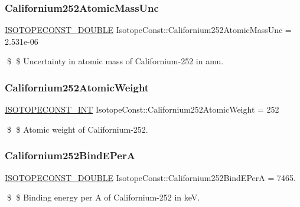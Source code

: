 \subsubsection{\texorpdfstring{Californium252\+Atomic\+Mass\+Unc}{Californium252AtomicMassUnc}}
{\footnotesize\ttfamily \mbox{\hyperlink{group___isotope_const-_macros_ga8f45a7272ce02c0b4c65c44636ed719a}{I\+S\+O\+T\+O\+P\+E\+C\+O\+N\+S\+T\+\_\+\+D\+O\+U\+B\+LE}} Isotope\+Const\+::\+Californium252\+Atomic\+Mass\+Unc = 2.\+531e-\/06}

\$ \$ Uncertainty in atomic mass of Californium-\/252 in amu. \mbox{\label{group___isotope_const-_californium-_cf252_ga51081fcf255fac099ec5047fd42c68a4}} 
\subsubsection{\texorpdfstring{Californium252\+Atomic\+Weight}{Californium252AtomicWeight}}
{\footnotesize\ttfamily \mbox{\hyperlink{group___isotope_const-_macros_ga5f18360b3e99483a35c32d789e62621c}{I\+S\+O\+T\+O\+P\+E\+C\+O\+N\+S\+T\+\_\+\+I\+NT}} Isotope\+Const\+::\+Californium252\+Atomic\+Weight = 252}

\$ \$ Atomic weight of Californium-\/252. \mbox{\label{group___isotope_const-_californium-_cf252_ga22b9f8ddb8edafda23c8887112bb5a52}} 
\subsubsection{\texorpdfstring{Californium252\+Bind\+E\+PerA}{Californium252BindEPerA}}
{\footnotesize\ttfamily \mbox{\hyperlink{group___isotope_const-_macros_ga8f45a7272ce02c0b4c65c44636ed719a}{I\+S\+O\+T\+O\+P\+E\+C\+O\+N\+S\+T\+\_\+\+D\+O\+U\+B\+LE}} Isotope\+Const\+::\+Californium252\+Bind\+E\+PerA = 7465.}

\$ \$ Binding energy per A of Californium-\/252 in keV. \mbox{\label{group___isotope_const-_californium-_cf252_gabd008af6fb53811e77e23c932ad56197}} 
